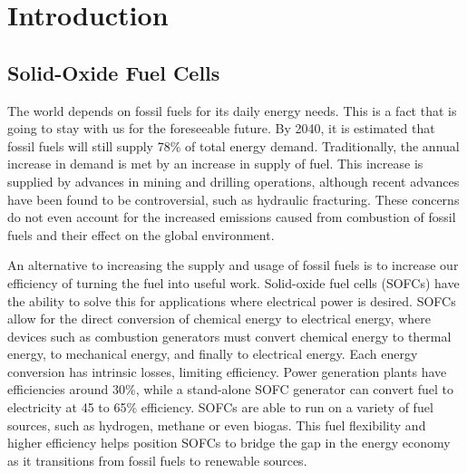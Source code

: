 


\chapter{Introduction}

\section{Solid-Oxide Fuel Cells}

The world depends on fossil fuels for its daily energy needs.
This is a fact that is going to stay with us for the foreseeable future.
By 2040, it is estimated that fossil fuels will still supply  78\% of total energy demand.\cite{U.S.EnergyInformationAdministration2016}
Traditionally, the annual increase in demand is met by an increase in supply of fuel.
This increase is supplied by advances in mining and drilling operations, although recent advances have been found to be controversial, such as hydraulic fracturing.\cite{Osborn2011,Vengosh2014}
These concerns do not even account for the increased emissions caused from combustion of fossil fuels and their effect on the global environment.\cite{Solomon2009,Hansen1981,U.S.EnvironmentalProtectionAgency2017}

An alternative to increasing the supply and usage of fossil fuels is to increase our efficiency of turning the fuel into useful work.
Solid-oxide fuel cells (SOFCs) have the ability to solve this for applications where electrical power is desired.
SOFCs allow for the direct conversion of chemical energy to electrical energy, where devices such as combustion generators must convert chemical energy to thermal energy, to mechanical energy, and finally to electrical energy.
Each energy conversion has intrinsic losses, limiting efficiency.
Power generation plants have efficiencies around 30\%, while a stand-alone SOFC generator can convert fuel to electricity at 45 to 65\% efficiency.\cite{Wachsman2011a,Lasseter2004}
SOFCs are able to run on a variety of fuel sources, such as hydrogen, methane or even biogas.\cite{Park2000,Minh2004}
This fuel flexibility and higher efficiency helps position SOFCs to bridge the gap in the energy economy as it transitions from fossil fuels to renewable sources.

